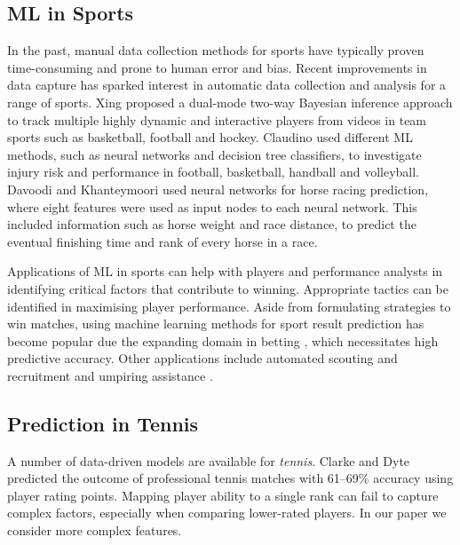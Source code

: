 \subsection{ML in Sports}

In the past, manual data collection methods for sports have typically proven time-consuming and prone to human error and bias. Recent improvements in data capture has sparked interest in automatic data collection and analysis for a range of sports. Xing \etal \cite{xing2010multiple} proposed a dual-mode two-way Bayesian inference approach to track multiple highly dynamic and interactive players from videos in team sports such as basketball, football and hockey. Claudino \etal \cite{claudino2019current} used different ML methods, such as neural networks and decision tree classifiers, to investigate injury risk and performance in football, basketball, handball and volleyball. Davoodi and Khanteymoori \cite{davoodi2010horse} used neural networks for horse racing prediction, where eight features were used as input nodes to each neural network. This included information such as horse weight and race distance, to predict the eventual finishing time and rank of every horse in a race. 




Applications of ML in sports can help with players and performance analysts in identifying critical factors that contribute to winning. Appropriate tactics can be identified in maximising player performance.
Aside from formulating strategies to win matches, using machine learning methods for sport result prediction has become popular due the expanding domain in betting \cite{bunker2019machine}, which necessitates high predictive accuracy. Other applications include automated scouting and recruitment \cite{bunker2019machine} and umpiring assistance \cite{vzemgulys2018recognition}.


\subsection{Prediction in Tennis}
A number of data-driven models are available for \textit{tennis}. 
Clarke and Dyte \cite{clarke2000using} predicted the outcome of professional tennis matches with 61--69\% accuracy using player rating points. Mapping player ability to a single rank can fail to capture complex factors, especially when comparing lower-rated players. In our paper we consider more complex features.

